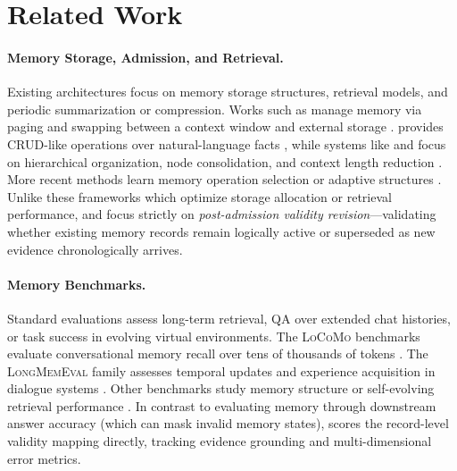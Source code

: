 \section{Related Work}

\paragraph{Memory Storage, Admission, and Retrieval.}
Existing architectures focus on memory storage structures, retrieval models, and periodic summarization or compression. Works such as  manage memory via paging and swapping between a context window and external storage \cite{packer_memgpt_2024}.  provides CRUD-like operations over natural-language facts \cite{chhikara_mem0_2025}, while systems like  and  focus on hierarchical organization, node consolidation, and context length reduction \cite{xu_-mem_2025,kang_memory_2025}. More recent methods learn memory operation selection or adaptive structures \cite{yu_agentic_2026,lu_choosing_2026,xu_structmem_2026,zhang_adaptive_2026}. 
Unlike these frameworks which optimize storage allocation or retrieval performance, \bench{} and \method{} focus strictly on \emph{post-admission validity revision}—validating whether existing memory records remain logically active or superseded as new evidence chronologically arrives.

\paragraph{Memory Benchmarks.}
Standard evaluations assess long-term retrieval, QA over extended chat histories, or task success in evolving virtual environments. The \textsc{LoCoMo} benchmarks evaluate conversational memory recall over tens of thousands of tokens \cite{maharana_evaluating_2024,li_locomo-plus_2026}. The \textsc{LongMemEval} family assesses temporal updates and experience acquisition in dialogue systems \cite{wu_longmemeval_2025,wu_longmemeval-v2_2026}. Other benchmarks study memory structure or self-evolving retrieval performance \cite{tan_membench_2025,shutova_evaluating_2026,wang_evomembench_2026,hu_evaluating_2026}. 
In contrast to evaluating memory through downstream answer accuracy (which can mask invalid memory states), \bench{} scores the record-level validity mapping directly, tracking evidence grounding and multi-dimensional error metrics.

